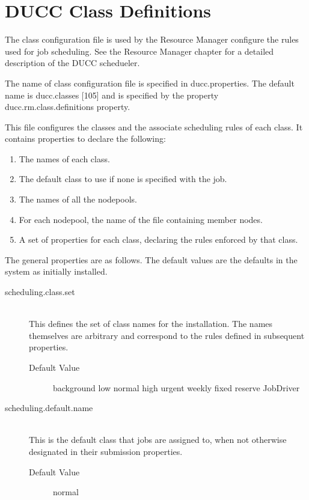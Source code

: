 \section{DUCC Class Definitions}
\label{sec:ducc.classes}

    The class configuration file is used by the Resource Manager configure the rules used for job 
    scheduling. See the Resource Manager chapter for a detailed description of the DUCC schedueler. 

    The name of class configuration file is specified in ducc.properties. The default name is 
    ducc.classes [105] and is specified by the property ducc.rm.class.definitions property. 

    This file configures the classes and the associate scheduling rules of each class. It contains 
    properties to declare the following: 
    \begin{enumerate}
      \item The names of each class. 
      \item The default class to use if none is specified with the job. 
      \item The names of all the nodepools. 
      \item For each nodepool, the name of the file containing member nodes. 
      \item A set of properties for each class, declaring the rules enforced by that class. 
    \end{enumerate}

    The general properties are as follows. The default values are the defaults in the system as initially 
    installed. 

    \begin{description}

      \item[scheduling.class.set] \hfill \\
        This defines the set of class names for the installation.  The names themselves are arbitrary
        and correspond to the rules defined in subsequent properties.

        \begin{description}
          \item[Default Value] background low normal high urgent weekly fixed reserve JobDriver 
        \end{description}
          
      \item[scheduling.default.name] \hfill \\
        This is the default class that jobs are assigned to, when not otherwise designated in their 
        submission properties. 
        \begin{description}
          \item[Default Value] normal 
        \end{description}
    \end{description}        
    
